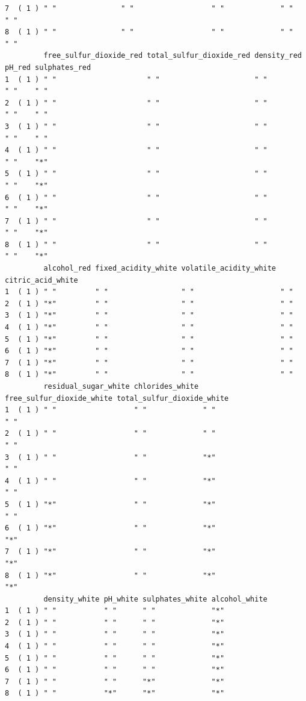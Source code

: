 \documentclass{report}
\begin{document}
\begin{verbatim}
7  ( 1 ) " "               " "                  " "             " "                " "          
8  ( 1 ) " "               " "                  " "             " "                " "          
         free_sulfur_dioxide_red total_sulfur_dioxide_red density_red pH_red sulphates_red
1  ( 1 ) " "                     " "                      " "         " "    " "          
2  ( 1 ) " "                     " "                      " "         " "    " "          
3  ( 1 ) " "                     " "                      " "         " "    " "          
4  ( 1 ) " "                     " "                      " "         " "    "*"          
5  ( 1 ) " "                     " "                      " "         " "    "*"          
6  ( 1 ) " "                     " "                      " "         " "    "*"          
7  ( 1 ) " "                     " "                      " "         " "    "*"          
8  ( 1 ) " "                     " "                      " "         " "    "*"          
         alcohol_red fixed_acidity_white volatile_acidity_white citric_acid_white
1  ( 1 ) " "         " "                 " "                    " "              
2  ( 1 ) "*"         " "                 " "                    " "              
3  ( 1 ) "*"         " "                 " "                    " "              
4  ( 1 ) "*"         " "                 " "                    " "              
5  ( 1 ) "*"         " "                 " "                    " "              
6  ( 1 ) "*"         " "                 " "                    " "              
7  ( 1 ) "*"         " "                 " "                    " "              
8  ( 1 ) "*"         " "                 " "                    " "              
         residual_sugar_white chlorides_white free_sulfur_dioxide_white total_sulfur_dioxide_white
1  ( 1 ) " "                  " "             " "                       " "                       
2  ( 1 ) " "                  " "             " "                       " "                       
3  ( 1 ) " "                  " "             "*"                       " "                       
4  ( 1 ) " "                  " "             "*"                       " "                       
5  ( 1 ) "*"                  " "             "*"                       " "                       
6  ( 1 ) "*"                  " "             "*"                       "*"                       
7  ( 1 ) "*"                  " "             "*"                       "*"                       
8  ( 1 ) "*"                  " "             "*"                       "*"                       
         density_white pH_white sulphates_white alcohol_white 
1  ( 1 ) " "           " "      " "             "*"           
2  ( 1 ) " "           " "      " "             "*"            
3  ( 1 ) " "           " "      " "             "*"            
4  ( 1 ) " "           " "      " "             "*"            
5  ( 1 ) " "           " "      " "             "*"            
6  ( 1 ) " "           " "      " "             "*"            
7  ( 1 ) " "           " "      "*"             "*"            
8  ( 1 ) " "           "*"      "*"             "*"            
\end{verbatim}
\end{document}
